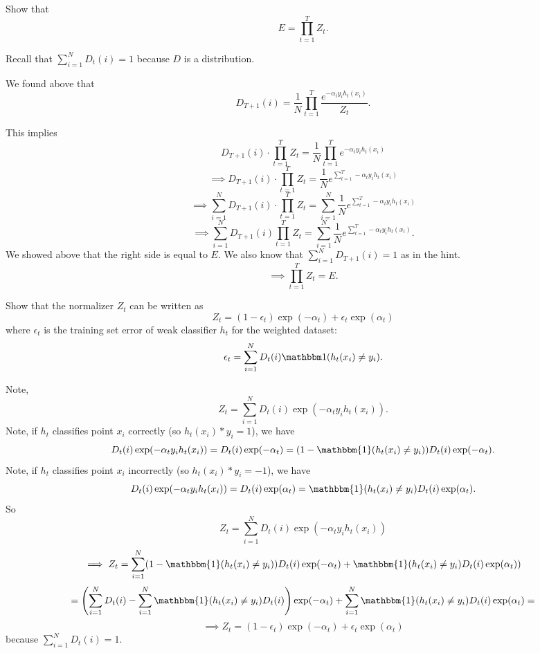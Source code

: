 \problem[5]
Show that
$$E = \prod\limits_{t=1}^T Z_t.$$

\begin{hint}
	Recall that $\sum_{i = 1}^N D_t(i) = 1$ because $D$ is a distribution.
\end{hint}

\begin{solution}
	We found above that 
	\[
	D_{T+1}(i) = \frac{1}{N} \prod_{t=1}^T\frac{e^{-\alpha_t y_i h_t(x_i)}}{Z_t}.
	\]
	
	This implies
	\[
	D_{T+1}(i) \cdot \prod_{t=1}^T {Z_t} = \frac{1}{N} \prod_{t=1}^T e^{-\alpha_t y_i h_t(x_i)}
	\]
	\[
	\implies D_{T+1}(i) \cdot \prod_{t=1}^T {Z_t} =  \frac{1}{N} e^{\sum_{t=1}^T -\alpha_t y_i h_t(x_i)}
	\]
	\[
	\implies \sum_{i=1}^N  D_{T+1}(i) \cdot \prod_{t=1}^T {Z_t} = \sum_{i=1}^N  \frac{1}{N} e^{\sum_{t=1}^T -\alpha_t y_i h_t(x_i)}
	\]
	\[
	\implies \sum_{i=1}^N D_{T+1}(i) \prod_{t=1}^T {Z_t} = \sum_{i=1}^N  \frac{1}{N} e^{\sum_{t=1}^T -\alpha_t y_i h_t(x_i)}.
	\]
	We showed above that the right side is equal to $E$.  We also know that $\sum_{i=1}^N D_{T+1}(i) = 1$ as in the hint.
	\[
	\implies \boxed{\prod_{t=1}^T {Z_t} =E}.
	\]
\end{solution}

\problem[5]
Show that the normalizer $Z_t$ can be written as
\[Z_t = (1 - \epsilon_t) \exp(-\alpha_t) + \epsilon_{t} \exp(\alpha_t)\]
where $\epsilon_t$ is the training set error of weak classifier $h_t$ for the weighted dataset:
\[\epsilon_t = \sum\limits_{i=1}^N D_t(i)\mathbbm1(h_t(x_i) \neq y_i).\]

\begin{solution}
	Note, 
	\[
	Z_t = \sum_{i=1}^N D_t(i) \exp(-\alpha_t y_i h_t(x_i)).
	\]
	Note, if $h_t$ classifies point $x_i$ correctly (so $h_t(x_i) * y_i = 1$), we have
	\[ D_t(i) \exp(-\alpha_t y_i h_t(x_i)) = D_t(i) \exp(-\alpha_t) = (1  - \mathbbm{1}(h_t(x_i) \neq y_i))D_t(i) \exp(-\alpha_t). \] Note, if $h_t$ classifies point $x_i$ incorrectly (so $h_t(x_i) * y_i = -1$), we have 
	\[ D_t(i) \exp(-\alpha_t y_i h_t(x_i)) = D_t(i) \exp(\alpha_t) = \mathbbm{1}(h_t(x_i) \neq y_i) D_t(i) \exp(\alpha_t).\]
	So \[Z_t = \sum_{i=1}^N D_t(i) \exp(-\alpha_t y_i h_t(x_i))\]
	\[ \implies Z_t =  \sum_{i=1}^N (1  - \mathbbm{1}(h_t(x_i) \neq y_i))D_t(i) \exp(-\alpha_t) + \mathbbm{1}(h_t(x_i) \neq y_i) D_t(i) \exp(\alpha_t)) \]
	\[ = \left(\sum_{i=1}^N D_t(i) - \sum_{i = 1}^N \mathbbm{1}(h_t(x_i) \neq y_i)D_t(i)\right)\exp(-\alpha_t) + \sum_{i = 1}^N\mathbbm{1}(h_t(x_i) \neq y_i) D_t(i) \exp(\alpha_t) = \]
	\[\implies \boxed{Z_t = (1-\epsilon_t)\exp(-\alpha_t) + \epsilon_t \exp(\alpha_t)}\]
	because $\sum_{i=1}^N D_t(i) = 1$.
	
\end{solution}

